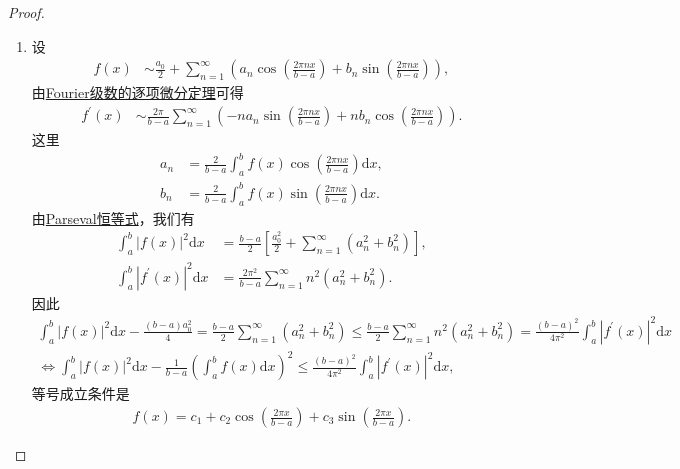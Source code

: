 \documentclass[../../main.tex]{subfiles}
\begin{document}
\begin{proof}
\begin{enumerate}[(1)]
\item 设
\begin{align*}
f(x) &\sim \frac{a_0}{2}+\sum_{n = 1}^{\infty}\left(a_n\cos\left(\frac{2\pi nx}{b - a}\right)+b_n\sin\left(\frac{2\pi nx}{b - a}\right)\right),
\end{align*}
由\hyperref[theorem:Fourier级数的逐项微分定理]{Fourier级数的逐项微分定理}可得
\begin{align*}
f^{\prime}(x) &\sim \frac{2\pi}{b - a}\sum_{n = 1}^{\infty}\left(-na_n\sin\left(\frac{2\pi nx}{b - a}\right)+nb_n\cos\left(\frac{2\pi nx}{b - a}\right)\right).
\end{align*}
这里
\begin{align*}
a_n&=\frac{2}{b - a}\int_{a}^{b}f(x)\cos\left(\frac{2\pi nx}{b - a}\right)\mathrm{d}x,\\
b_n&=\frac{2}{b - a}\int_{a}^{b}f(x)\sin\left(\frac{2\pi nx}{b - a}\right)\mathrm{d}x.
\end{align*}
由\hyperref[theorem:Parseval恒等式]{Parseval恒等式}，我们有
\begin{align*}
\int_{a}^{b}|f(x)|^2\mathrm{d}x&=\frac{b - a}{2}\left[\frac{a_0^2}{2}+\sum_{n = 1}^{\infty}(a_n^2 + b_n^2)\right],\\
\int_{a}^{b}|f^{\prime}(x)|^2\mathrm{d}x&=\frac{2\pi^2}{b - a}\sum_{n = 1}^{\infty}n^2(a_n^2 + b_n^2).
\end{align*}
因此
\begin{gather*}
\int_a^b{|f(x)|^2\mathrm{d}x}-\frac{\left( b-a \right) a_{0}^{2}}{4}=\frac{b-a}{2}\sum_{n=1}^{\infty}{\left( a_{n}^{2}+b_{n}^{2} \right)}\leqslant \frac{b-a}{2}\sum_{n=1}^{\infty}{n^2\left( a_{n}^{2}+b_{n}^{2} \right)}=\frac{(b-a)^2}{4\pi ^2}\int_a^b{|f^{\prime}(x)|^2\mathrm{d}x}
\\
\Longleftrightarrow \int_a^b{|f(x)|^2\mathrm{d}x}-\frac{1}{b-a}\left( \int_a^b{f(x)\mathrm{d}x} \right) ^2\le \frac{(b-a)^2}{4\pi ^2}\int_a^b{|f^{\prime}(x)|^2\mathrm{d}x},
\end{gather*}
等号成立条件是
\begin{align*}
f(x)=c_1 + c_2\cos\left(\frac{2\pi x}{b - a}\right)+c_3\sin\left(\frac{2\pi x}{b - a}\right).
\end{align*}


\end{enumerate}
\end{proof}
\end{document}
